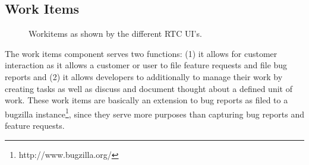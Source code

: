 \subsection{Work Items}
\begin{figure}
\centering
{}

\caption{Workitems as shown by the different RTC UI's.}
\label{fig:wi}
\end{figure}
The work items component serves two functions: (1) it allows for customer interaction as it allows a customer or user to file feature requests and file bug reports and (2) it allows developers to additionally to manage their work by creating tasks as well as discuss and document thought about a defined unit of work.
These work items are basically an extension to bug reports as filed to a bugzilla instance\footnote{http://www.bugzilla.org/}, since they serve more purposes than capturing bug reports and feature requests.

